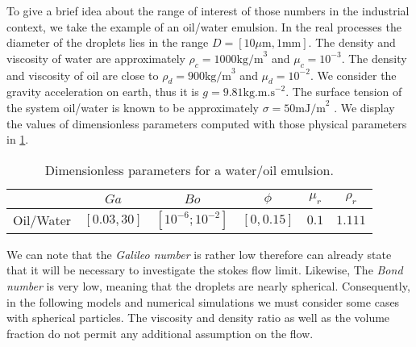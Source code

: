 To give a brief idea about the range of interest of those numbers in the industrial context, we take the example of an oil/water emulsion.
In the real processes the diameter of the droplets lies in the range $D = [10 \mu \text{m}, 1 \text{mm}]$.
The density and viscosity of water are approximately $\rho_c = 1000 \text{kg/m}^3$ and $\mu_c = 10^{-3}$.
The density and viscosity of oil are close to $\rho_d = 900 \text{kg/m}^3$ and $\mu_d = 10^{-2}$.
We consider the gravity acceleration on earth, thus it is $g= 9.81 \text{kg.m.s}^{-2}$.
The surface tension of the system oil/water is known to be approximately $\sigma = 50 \text{mJ/m}^2$ \citep{de2015gouttes}. 
We display the values of dimensionless parameters computed with those physical parameters in \ref{tab:parameters}.
\begin{table}[h!]
    \centering
    \caption{Dimensionless parameters for a water/oil emulsion.}
    \begin{tabular}{|c||c|c|c|c|c|}
        \hline&$Ga$&$Bo$&$\phi$&$\mu_r$&$\rho_r$\\ \hline
        \hline Oil/Water&$[0.03,30]$&$[10^{-6};10^{-2}]$&$[0,0.15]$&$0.1$&$1.111$\\ \hline
    \end{tabular}
    \label{tab:parameters}
\end{table}
We can note that the \textit{Galileo number} is rather low therefore can already state that it will be necessary to investigate the stokes flow limit. 
Likewise, The \textit{Bond number} is very low, meaning that the droplets are nearly spherical.
Consequently, in the following models and numerical simulations we must consider some cases with spherical particles. 
The viscosity and density ratio as well as the volume fraction do not permit any additional assumption on the flow. 
